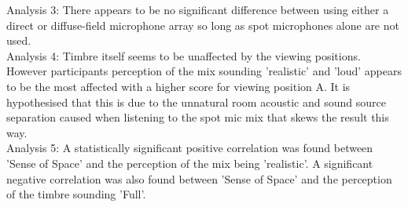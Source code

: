 		Analysis 3: There appears to be no significant difference between using either a direct or diffuse-field microphone array so long as spot microphones alone are not used.\\

		Analysis 4: Timbre itself seems to be unaffected by the viewing positions. However participants perception of the mix sounding 'realistic' and 'loud' appears to be the most affected with a higher score for viewing position A. It is hypothesised that this is due to the unnatural room acoustic and sound source separation caused when listening to the spot mic mix that skews the result this way.\\

		Analysis 5: A statistically significant positive correlation was found between 'Sense of Space' and the perception of the mix being 'realistic'. A significant negative correlation was also found between 'Sense of Space' and the perception of the timbre sounding 'Full'.\\

